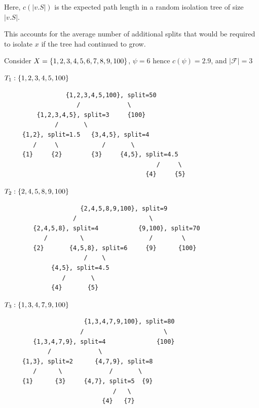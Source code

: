 \documentclass{article}
\begin{document}
Here, \( c(|v.S|) \) is the expected path length in a random isolation tree of size \( |v.S| \).

This accounts for the average number of additional splits that would be required to isolate \( x \) if the tree had continued to grow.

Consider $X=\{1,2,3,4,5,6,7,8,9,100\}$, $\psi=6$ hence $c(\psi)=2.9$, and $|\mathcal{F}|=3$

$T_1: \{1,2,3,4,5,100\}$
\begin{verbatim}
                 {1,2,3,4,5,100}, split=50
                    /             \
         {1,2,3,4,5}, split=3     {100}
              /       \
     {1,2}, split=1.5   {3,4,5}, split=4
        /     \            /       \
     {1}     {2}        {3}     {4,5}, split=4.5
                                          /     \
                                       {4}     {5}
\end{verbatim}


$T_2: \{2,4,5,8,9,100\}$

\begin{verbatim}
                     {2,4,5,8,9,100}, split=9
                   /                    \
        {2,4,5,8}, split=4           {9,100}, split=70
           /         \                  /        \
        {2}       {4,5,8}, split=6     {9}      {100}
                      /    \
             {4,5}, split=4.5
                /       \
             {4}       {5}
\end{verbatim}

$T_3: \{1,3,4,7,9,100\}$

\begin{verbatim}
                      {1,3,4,7,9,100}, split=80
                     /                      \
        {1,3,4,7,9}, split=4              {100}
            /             \
     {1,3}, split=2      {4,7,9}, split=8
        /      \             /       \
     {1}      {3}     {4,7}, split=5  {9}
                              /   \
                           {4}   {7}
\end{verbatim}
\end{document}
